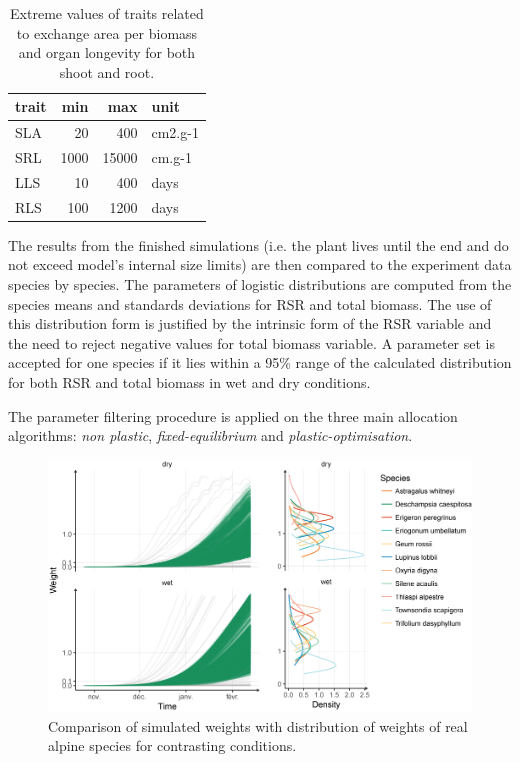 \begin{table}[]
\centering
\caption{Extreme values of traits related to exchange area per biomass and organ longevity for both shoot and root.}
\label{table:boudaries}
\begin{tabular}{lrrl}
trait & min  & max   & unit    \\ \hline
SLA   & 20   & 400   & cm2.g-1 \\
SRL   & 1000 & 15000 & cm.g-1  \\
LLS   & 10   & 400   & days    \\
RLS   & 100  & 1200  & days   
\end{tabular}
\end{table}


The results from the finished simulations (i.e. the plant lives until the end and do not exceed model's internal size limits) are then compared to the experiment data species by species. The parameters of logistic distributions are computed from the species means and standards deviations for RSR and total biomass. The use of this distribution form is justified by the intrinsic form of the RSR variable and the need to reject negative values for total biomass variable. A parameter set is accepted for one species if it lies within a 95\% range of the calculated distribution for both RSR and total biomass in wet and dry conditions.

The parameter filtering procedure is applied on the three main allocation algorithms: \textit{non plastic}, \textit{fixed-equilibrium} and \textit{plastic-optimisation}.

\begin{figure}\label{fig:comparison_BM}
\includegraphics[width = \textwidth]{./2_PP/Figures/Calibration/weight_full_sim.png}
\caption{Comparison of simulated weights with distribution of weights of real alpine species for contrasting conditions.}
\end{figure}

